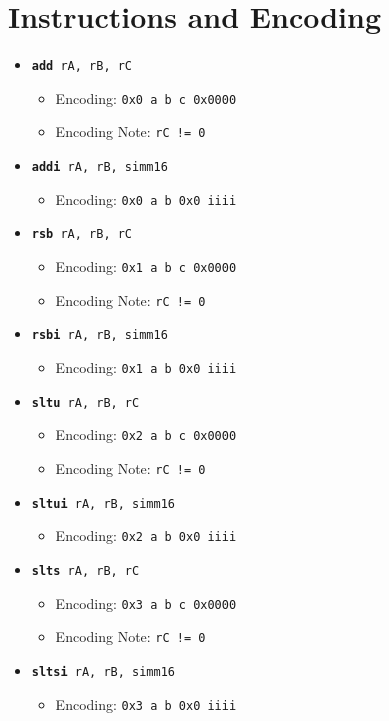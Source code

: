 \documentclass{article}
\begin{document}
	\section{Instructions and Encoding}
	\begin{itemize}
		\item \texttt{\textbf{add} rA, rB, rC}
		\begin{itemize}
			\item Encoding:  \texttt{0x0 a b c  0x0000}
			\item Encoding Note:  \texttt{rC != 0}
		\end{itemize}
		\item \texttt{\textbf{addi} rA, rB, simm16}
		\begin{itemize}
			\item Encoding:  \texttt{0x0 a b 0x0  iiii}
		\end{itemize}

		\item \texttt{\textbf{rsb} rA, rB, rC}
		\begin{itemize}
			\item Encoding:  \texttt{0x1 a b c  0x0000}
			\item Encoding Note:  \texttt{rC != 0}
		\end{itemize}
		\item \texttt{\textbf{rsbi} rA, rB, simm16}
		\begin{itemize}
			\item Encoding:  \texttt{0x1 a b 0x0  iiii}
		\end{itemize}

		\item \texttt{\textbf{sltu} rA, rB, rC}
		\begin{itemize}
			\item Encoding:  \texttt{0x2 a b c  0x0000}
			\item Encoding Note:  \texttt{rC != 0}
		\end{itemize}
		\item \texttt{\textbf{sltui} rA, rB, simm16}
		\begin{itemize}
			\item Encoding:  \texttt{0x2 a b 0x0  iiii}
		\end{itemize}

		\item \texttt{\textbf{slts} rA, rB, rC}
		\begin{itemize}
			\item Encoding:  \texttt{0x3 a b c  0x0000}
			\item Encoding Note:  \texttt{rC != 0}
		\end{itemize}
		\item \texttt{\textbf{sltsi} rA, rB, simm16}
		\begin{itemize}
			\item Encoding:  \texttt{0x3 a b 0x0  iiii}
		\end{itemize}



\end{itemize}
\end{document}
